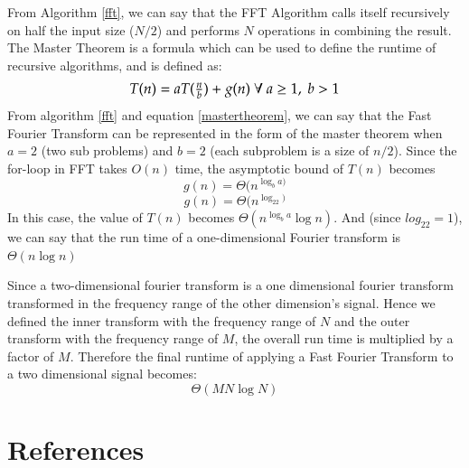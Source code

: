 \documentclass[a4paper,11pt]{article}
\begin{document}
From Algorithm \eqref{fft}, we can say that the FFT Algorithm calls itself recursively on half the input size ($N/2$) and performs $N$ operations in combining the result. 
\newline
The Master Theorem is  a formula which can be used to define the runtime of recursive algorithms, and is defined as:
\newline
\begin{equation}
\label{mastertheorem}
    \scalebox{1.15}{$T(n) = aT(\frac{n}{b}) + g(n) \ \forall\  a \geq 1,\  b > 1$}
\end{equation}
From algorithm \ref{fft} and equation \eqref{mastertheorem}, we can say that the Fast Fourier Transform can be represented in the form of the master theorem when $a=2$ (two sub problems) and $b=2$ (each subproblem is a size of $n/2$). Since the for-loop in FFT takes $O(n)$ time, the asymptotic bound of $T(n)$ becomes
\[
g(n) = \Theta(n^{\log_ba)}
\]
\[
g(n) = \Theta(n^{\log_22)}
\]
\newline
In this case, the value of $T(n)$ becomes $\Theta(n^{\log_ba}\log n)$. And (since $log_22 = 1$), we can say that the run time of a one-dimensional Fourier transform is $\Theta(n\log n)$ 

Since a two-dimensional fourier transform is a one dimensional fourier transform transformed in the frequency range of the other dimension's signal. Hence we defined the inner transform with the frequency range of $N$ and the outer transform with the frequency range of $M$, the overall run time is multiplied by a factor of $M$.
\newline
Therefore the final runtime of applying a Fast Fourier Transform to a two dimensional signal becomes:
\begin{equation}
    \Theta(MN\log N)
\end{equation}
\section{References}
\nocite{*}
\printbibliography[heading=none]
\end{document}
